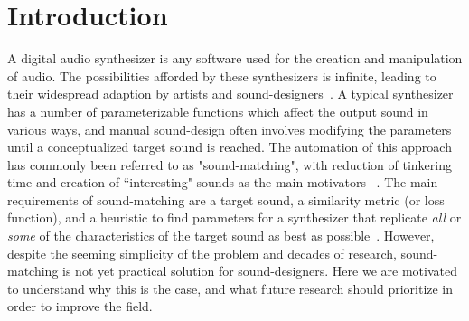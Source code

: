 \documentclass[lettersize,journal]{IEEEtran}
\begin{document}
\section{Introduction}


A digital audio synthesizer is any software used for the creation and manipulation of audio. The possibilities afforded by these synthesizers is infinite, leading to their widespread adaption by artists and sound-designers~\cite{lyons1997understanding,russ1999sound,stranneby2004digital}. A typical synthesizer has a number of parameterizable functions which affect the output sound in various ways, and manual sound-design often involves modifying the parameters until a conceptualized target sound is reached. The automation of this approach has commonly been referred to as "sound-matching", with reduction of tinkering time and creation of ``interesting" sounds as the main motivators ~\cite{krekovic2019insights,turian2020sorry,horner1993machine,salimi2020make,esling2019flow,engel2020ddsp,mitchell2007evolutionary,shier2020spiegelib,masuda2021soundmatch,masuda2023improving}. The main requirements of sound-matching are a target sound, a similarity metric (or loss function), and a heuristic to find parameters for a synthesizer that replicate \textit{all} or \textit{some} of the characteristics of the target sound as best as possible~\cite{horner1993machine,mitchell2007evolutionary,masuda2023improving}. However, despite the seeming simplicity of the problem and decades of research, sound-matching is not yet practical solution for sound-designers. Here we are motivated to understand why this is the case, and what future research should prioritize in order to improve the field. 
\end{document}

